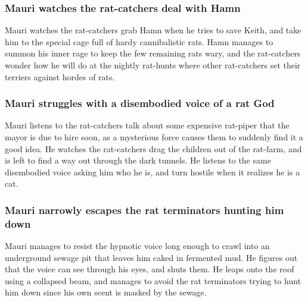 \subsubsection{\Gls{Mauri} watches the rat-catchers deal with \Gls{Hamn}}
\Gls{Mauri} watches the rat-catchers grab \Gls{Hamn} when he tries to save \Gls{Keith}, and take him
to the special cage full of hardy cannibalistic rats. \Gls{Hamn} manages to summon his inner rage to
keep the few remaining rats wary, and the rat-catchers wonder how he will do at the nightly
rat-hunts where other rat-catchers set their terriers against hordes of rats.

\subsubsection{\Gls{Mauri} struggles with a disembodied voice of a rat God}
\Gls{Mauri} listens to the rat-catchers talk about some expensive rat-piper that the mayor is due
to hire soon, as a mysterious force causes them to suddenly find it a good idea. He watches the
rat-catchers drag the children out of the rat-farm, and is left to find a way out through the dark
tunnels. He listens to the same disembodied voice asking him who he is, and turn hostile when it
realizes he is a cat.

\subsubsection{\Gls{Mauri} narrowly escapes the rat terminators hunting him down}
\Gls{Mauri} manages to resist the hypnotic voice long enough to crawl into an underground sewage
pit that leaves him caked in fermented mud. He figures out that the voice can see through his eyes,
and shuts them. He leaps onto the roof using a collapsed beam, and manages to avoid the rat
terminators trying to hunt him down since his own scent is masked by the sewage.

\subsection{}
\subsubsection{}

